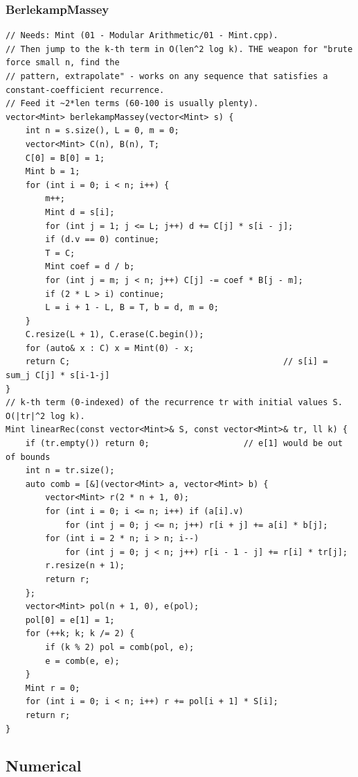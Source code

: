 \documentclass[9pt,a4paper,twocolumn]{extarticle}
\begin{document}
\subsubsection{BerlekampMassey}
\nopagebreak
\begin{lstlisting}
// Needs: Mint (01 - Modular Arithmetic/01 - Mint.cpp).
// Then jump to the k-th term in O(len^2 log k). THE weapon for "brute force small n, find the
// pattern, extrapolate" - works on any sequence that satisfies a constant-coefficient recurrence.
// Feed it ~2*len terms (60-100 is usually plenty).
vector<Mint> berlekampMassey(vector<Mint> s) {
    int n = s.size(), L = 0, m = 0;
    vector<Mint> C(n), B(n), T;
    C[0] = B[0] = 1;
    Mint b = 1;
    for (int i = 0; i < n; i++) {
        m++;
        Mint d = s[i];
        for (int j = 1; j <= L; j++) d += C[j] * s[i - j];
        if (d.v == 0) continue;
        T = C;
        Mint coef = d / b;
        for (int j = m; j < n; j++) C[j] -= coef * B[j - m];
        if (2 * L > i) continue;
        L = i + 1 - L, B = T, b = d, m = 0;
    }
    C.resize(L + 1), C.erase(C.begin());
    for (auto& x : C) x = Mint(0) - x;
    return C;                                           // s[i] = sum_j C[j] * s[i-1-j]
}
// k-th term (0-indexed) of the recurrence tr with initial values S. O(|tr|^2 log k).
Mint linearRec(const vector<Mint>& S, const vector<Mint>& tr, ll k) {
    if (tr.empty()) return 0;                   // e[1] would be out of bounds
    int n = tr.size();
    auto comb = [&](vector<Mint> a, vector<Mint> b) {
        vector<Mint> r(2 * n + 1, 0);
        for (int i = 0; i <= n; i++) if (a[i].v)
            for (int j = 0; j <= n; j++) r[i + j] += a[i] * b[j];
        for (int i = 2 * n; i > n; i--)
            for (int j = 0; j < n; j++) r[i - 1 - j] += r[i] * tr[j];
        r.resize(n + 1);
        return r;
    };
    vector<Mint> pol(n + 1, 0), e(pol);
    pol[0] = e[1] = 1;
    for (++k; k; k /= 2) {
        if (k % 2) pol = comb(pol, e);
        e = comb(e, e);
    }
    Mint r = 0;
    for (int i = 0; i < n; i++) r += pol[i + 1] * S[i];
    return r;
}
\end{lstlisting}

\subsection{Numerical}
\end{document}
